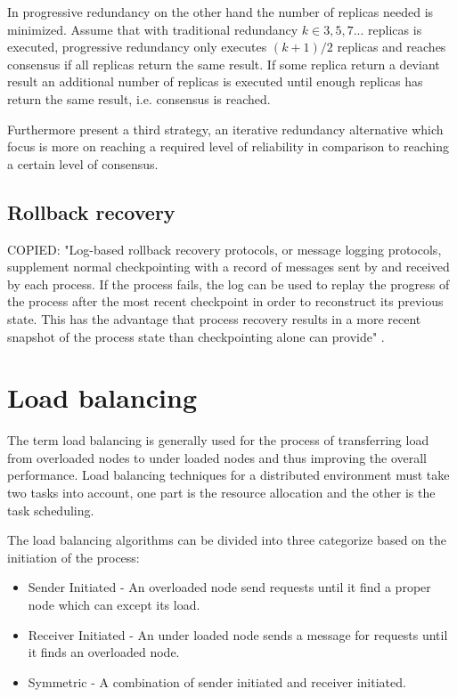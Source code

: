 \documentclass{cslthse-msc}
\begin{document}
In progressive redundancy on the other hand the number of replicas needed is minimized. Assume that with traditional redundancy $k \in {3,5,7...}$ replicas is executed, progressive redundancy only executes $(k+1)/2$ replicas and reaches consensus if all replicas return the same result. If some replica return a deviant result an additional number of replicas is executed until enough replicas has return the same result, i.e. consensus is reached. 

Furthermore \cite{selfAdaptRel} present a third strategy, an iterative redundancy alternative which focus is more on reaching a required level of reliability in comparison to reaching a certain level of consensus.

\subsection{Rollback recovery}
COPIED: "Log-based rollback recovery protocols, or message logging protocols, supplement normal checkpointing with a record of messages sent by and received by each process. If the process fails, the log can be used to replay the progress of the process after the most recent checkpoint in order to reconstruct its previous state. This has the advantage that process recovery results in a more recent snapshot of the process state than checkpointing alone can provide" \cite{surveyFaultParallel}.


\section{Load balancing}
The term load balancing is generally used for the process of transferring load from overloaded nodes to under loaded nodes and thus improving the overall performance. Load balancing techniques for a distributed environment must take two tasks into account, one part is the resource allocation and the other is the task scheduling. 

The load balancing algorithms can be divided into three categorize based on the initiation of the process:
\begin{itemize}
\item Sender Initiated - An overloaded node send requests until it find a proper node which can except its load.
\item Receiver Initiated - An under loaded node sends a message for requests until it finds an overloaded node.
\item Symmetric - A combination of sender initiated and receiver initiated. 
\end{itemize}
\end{document}
